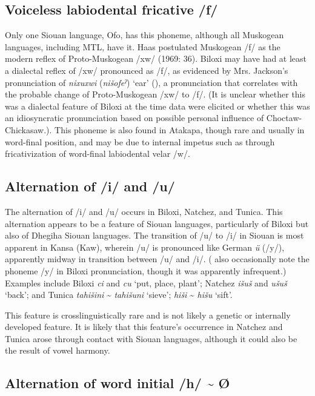 \documentclass[output=paper]{LSP/langsci}
\begin{document}
\subsection{Voiceless labiodental fricative /f/}

Only one Siouan language, Ofo, has this phoneme, although all Muskogean languages, including MTL, have it. Haas postulated Muskogean /f/ as the modern reflex of Proto-Muskogean /xw/ (1969: 36). Biloxi may have had at least a dialectal reflex of /xw/ pronounced as /f/, as evidenced by Mrs. Jackson’s pronunciation of \emph{nixuxwi} (\emph{nišofeˀ}) `ear' (\citealt[79]{HaasSwadesh1968}), a pronunciation that correlates with the probable change of Proto-Muskogean /xw/ to /f/. (It is unclear whether this was a dialectal feature of Biloxi at the time data were elicited or whether this was an idiosyncratic pronunciation based on possible personal influence of Choctaw-Chickasaw.). This phoneme is also found in Atakapa, though rare and usually in word-final position, and may be due to internal impetus such as through fricativization of word-final labiodental velar /w/.

\subsection{Alternation of /i/ and /u/}
	
The alternation of /i/ and /u/ occurs in Biloxi, Natchez, and Tunica. This alternation appears to be a feature of Siouan languages, particularly of Biloxi but also of Dhegiha Siouan languages. The transition of /u/ to /i/ in Siouan is most apparent in Kansa (Kaw), wherein /u/ is pronounced like German \emph{ü} (/y/), apparently midway in transition between /u/ and /i/. (\citealt{DorseySwanton1912} also occasionally note the phoneme /y/ in Biloxi pronunciation, though it was apparently infrequent.) Examples include Biloxi \emph{ci} and \emph{cu} `put, place, plant'; Natchez \emph{išuš} and \emph{ušuš} `back'; and Tunica \emph{tahišini} \textasciitilde{} \emph{tahišuni} `sieve';  \emph{hiši} \textasciitilde{} \emph{hišu} `sift'.

This feature is crosslinguistically rare and is not likely a genetic or internally developed feature. It is likely that this feature’s occurrence in Natchez and Tunica arose through contact with Siouan languages, although it could also be the result of vowel harmony. 

\subsection{Alternation of word initial /h/ \textasciitilde{} Ø}
\end{document}
